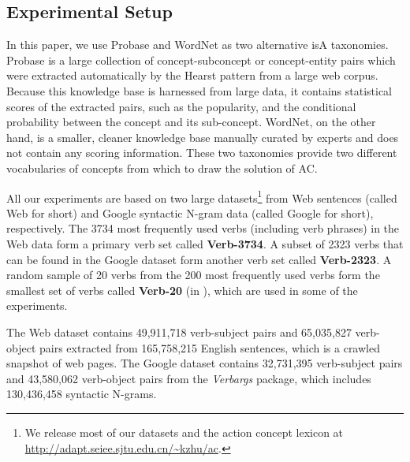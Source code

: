 \subsection{Experimental Setup}
\label{sec:preprocess}
In this paper, we use Probase\cite{WuLWZ12} and WordNet\cite{wordnet}
as two alternative isA taxonomies. Probase is a large collection of
concept-subconcept or concept-entity pairs which were
extracted automatically by the Hearst pattern\cite{Hearst92} from
a large web corpus. Because this knowledge base is harnessed from large
data, it contains statistical scores of the extracted pairs,
such as the popularity,
and the conditional probability between the concept and its sub-concept.
WordNet, on the other hand, is a smaller, cleaner knowledge base manually
curated by experts and does not contain any scoring information.
These two taxonomies provide two different vocabularies of concepts
from which to draw the solution of AC.

All our experiments are based on two large
datasets\footnote{We release most of
our datasets and the action concept lexicon at
\url{http://adapt.seiee.sjtu.edu.cn/~kzhu/ac}.}
from Web sentences (called Web for short) and
Google syntactic N-gram data\cite{goldberg2013,googlengram}
(called Google for short), respectively.
The 3734 most frequently used verbs (including verb phrases)
in the Web data form a primary verb set called {\bf Verb-3734}.
A subset of 2323 verbs that can be found in the Google dataset
form another verb set called {\bf Verb-2323}.
A random sample of 20 verbs from the 200 most frequently
used verbs form the smallest set of verbs called {\bf Verb-20}
(in ), %
which are used in some of the experiments.

The Web dataset contains 49,911,718 verb-subject pairs
and 65,035,827 verb-object pairs extracted from 165,758,215 English
sentences, which is a crawled snapshot of web pages.
The Google dataset contains
32,731,395 verb-subject pairs and 43,580,062 verb-object pairs
from the \emph{Verbargs} package, which includes 130,436,458
syntactic N-grams.%

